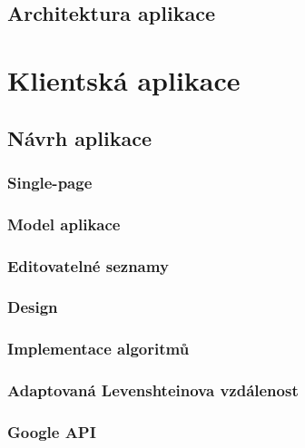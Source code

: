 \documentclass[a4paper,11pt,titlepage,fleqn]{article}
\begin{document}
    \subsection{Architektura aplikace}


\newpage
\section{Klientská aplikace}

    \subsection{Návrh aplikace}

        \subsubsection{Single-page}

        \subsubsection{Model aplikace}

        \subsubsection{Editovatelné seznamy}

        \subsubsection{Design}

        \subsubsection{Implementace algoritmů}

        \subsubsection{Adaptovaná Levenshteinova vzdálenost}

        \subsubsection{Google API}
\end{document}
